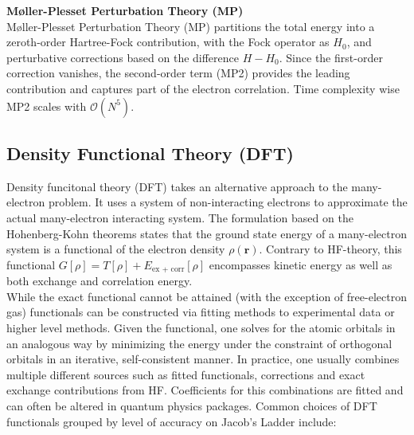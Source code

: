\textbf{Møller-Plesset Perturbation Theory (MP)}\\
Møller-Plesset Perturbation Theory (MP) partitions the total energy into a zeroth-order Hartree-Fock contribution, with the Fock operator as $H_0$, and perturbative corrections based on the difference $H - H_0$. Since the first-order correction vanishes, the second-order term (MP2) provides the leading contribution and captures part of the electron correlation. Time complexity wise MP2 scales with $\mathcal{O}(N^5)$. 

\subsection{Density Functional Theory (DFT)}
\label{subsec:background_dft}
Density funcitonal theory (DFT) takes an alternative approach to the many-electron problem. It uses a system of non-interacting electrons to approximate the actual many-electron interacting system. The formulation based on the Hohenberg-Kohn theorems \parencite{ref:hohenberg_kohn1964} states that the ground state energy of a many-electron system is a functional of the electron density $\rho(\mathbf{r})$. Contrary to HF-theory, this functional $G[\rho] = T[\rho] + E_{\text{ex + corr}}[\rho]$ encompasses kinetic energy as well as both exchange and correlation energy. \parencite{ref:kohn_sham_1965}\\
While the exact functional cannot be attained (with the exception of free-electron gas) functionals can be constructed via fitting methods to experimental data or higher level methods. Given the functional, one solves for the atomic orbitals in an analogous way by minimizing the energy under the constraint of orthogonal orbitals in an iterative, self-consistent manner. In practice, one usually combines multiple different sources such as fitted functionals, corrections and exact exchange contributions from HF. Coefficients for this combinations are fitted and can often be altered in quantum physics packages. 
Common choices of DFT functionals grouped by level of accuracy on Jacob's Ladder include:

